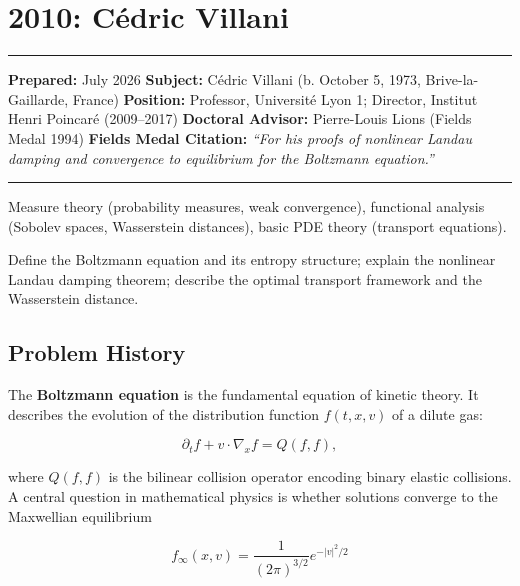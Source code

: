 \chapter{2010: Cédric Villani}\label{ch2010cedricvillani:cuxe9dric-villani-fields-medal-2010-a-comprehensive-report-on-his-work-and-impact}

\begin{center}\rule{0.5\linewidth}{0.5pt}\end{center}

\textbf{Prepared:} July 2026 \textbf{Subject:} Cédric Villani (b. October 5, 1973, Brive-la-Gaillarde, France) \textbf{Position:} Professor, Université Lyon 1; Director, Institut Henri Poincaré (2009--2017) \textbf{Doctoral Advisor:} Pierre-Louis Lions (Fields Medal 1994) \textbf{Fields Medal Citation:} \emph{``For his proofs of nonlinear Landau damping and convergence to equilibrium for the Boltzmann equation.''}

\begin{center}\rule{0.5\linewidth}{0.5pt}\end{center}

\begin{prereqs} Measure theory (probability measures, weak convergence), functional analysis (Sobolev spaces, Wasserstein distances), basic PDE theory (transport equations). \end{prereqs}

\begin{objectives} Define the Boltzmann equation and its entropy structure; explain the nonlinear Landau damping theorem; describe the optimal transport framework and the Wasserstein distance. \end{objectives}

\section{Problem History}\label{ch2010cedricvillani:problem-history}

The \textbf{Boltzmann equation} is the fundamental equation of kinetic theory. It describes the evolution of the distribution function $f(t,x,v)$ of a dilute gas:

\[
\partial_t f + v \cdot \nabla_x f = Q(f,f),
\]

where $Q(f,f)$ is the bilinear collision operator encoding binary elastic collisions. A central question in mathematical physics is whether solutions converge to the Maxwellian equilibrium

\[
f_\infty(x,v) = \frac{1}{(2\pi)^{3/2}} e^{-|v|^2/2}
\]

